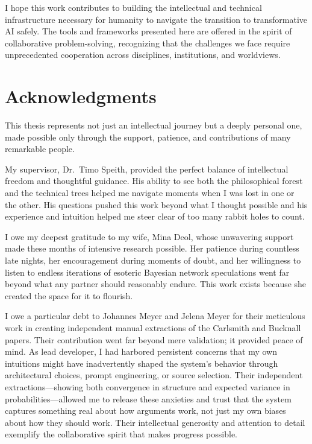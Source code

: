\documentclass[
  11pt,
  letterpaper,
  openany]{book}
\begin{document}
I hope this work contributes to building the intellectual and technical
infrastructure necessary for humanity to navigate the transition to
transformative AI safely. The tools and frameworks presented here are
offered in the spirit of collaborative problem-solving, recognizing that
the challenges we face require unprecedented cooperation across
disciplines, institutions, and worldviews.

\section{Acknowledgments}\label{acknowledgments}

This thesis represents not just an intellectual journey but a deeply
personal one, made possible only through the support, patience, and
contributions of many remarkable people.

My supervisor, Dr.~Timo Speith, provided the perfect balance of
intellectual freedom and thoughtful guidance. His ability to see both
the philosophical forest and the technical trees helped me navigate
moments when I was lost in one or the other. His questions pushed this
work beyond what I thought possible and his experience and intuition
helped me steer clear of too many rabbit holes to count.

I owe my deepest gratitude to my wife, Mina Deol, whose unwavering
support made these months of intensive research possible. Her patience
during countless late nights, her encouragement during moments of doubt,
and her willingness to listen to endless iterations of esoteric Bayesian
network speculations went far beyond what any partner should reasonably
endure. This work exists because she created the space for it to
flourish.

I owe a particular debt to Johannes Meyer and Jelena Meyer for their
meticulous work in creating independent manual extractions of the
Carlsmith and Bucknall papers. Their contribution went far beyond mere
validation; it provided peace of mind. As lead developer, I had harbored
persistent concerns that my own intuitions might have inadvertently
shaped the system's behavior through architectural choices, prompt
engineering, or source selection. Their independent
extractions---showing both convergence in structure and expected
variance in probabilities---allowed me to release these anxieties and
trust that the system captures something real about how arguments work,
not just my own biases about how they should work. Their intellectual
generosity and attention to detail exemplify the collaborative spirit
that makes progress possible.
\end{document}

